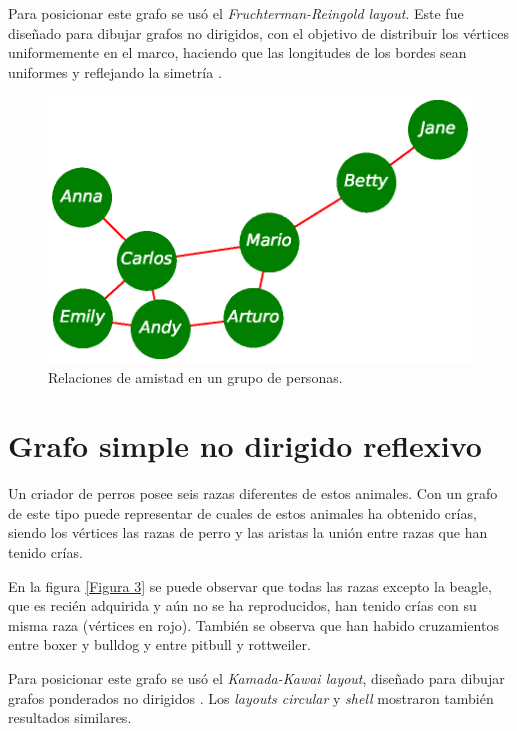 \documentclass{article}
\begin{document}
Para posicionar este grafo se usó el \textit{Fruchterman-Reingold layout}. Este fue diseñado para dibujar grafos no dirigidos, con el objetivo de distribuir los vértices uniformemente en el marco, haciendo que las longitudes de los bordes sean uniformes y reflejando la simetría \cite{fruchterman1991graph}.
 
\begin{figure}
 \begin{center}
  \includegraphics[width=.6\columnwidth]{fig2.eps}
   \end{center}
   \vspace*{-15mm}
  \caption{Relaciones de amistad en un grupo de personas.}
  \label{Figura 2}
\end{figure}



\section{Grafo simple no dirigido reflexivo}

Un criador de perros posee seis razas diferentes de estos animales. Con un grafo de este tipo puede representar de cuales de estos animales ha obtenido crías, siendo los vértices las razas de perro y las aristas la unión entre razas que han tenido crías.

En la figura \ref{Figura 3} se puede observar que todas las razas excepto la beagle, que es recién adquirida y aún no se ha reproducidos, han tenido crías con su misma raza (vértices en rojo). También se observa que han habido cruzamientos entre boxer y bulldog y entre pitbull y rottweiler.

Para posicionar este grafo se usó el \textit{Kamada-Kawai layout}, diseñado para dibujar grafos ponderados no dirigidos \cite{kamada1989algorithm}. Los \textit{layouts circular} y \textit{shell} mostraron también resultados similares.
\end{document}
